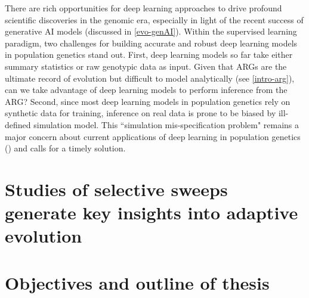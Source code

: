 There are rich opportunities for deep learning approaches to drive profound scientific discoveries in the genomic era, especially in light of the recent success of generative \ac{AI} models (discussed in \ref{evo-genAI}). Within the supervised learning paradigm, two challenges for building accurate and robust deep learning models in population genetics stand out. First, deep learning models so far take either summary statistics or raw genotypic data as input. Given that \acp{ARG} are the ultimate record of evolution but difficult to model analytically (see \ref{intro-arg}), can we take advantage of deep learning models to perform inference from the \ac{ARG}? Second, since most deep learning models in population genetics rely on synthetic data for training, inference on real data is prone to be biased by ill-defined simulation model. This ``simulation mis-specification problem" remains a major concern about current applications of deep learning in population genetics (\cite{korfmann_deep_2023}) and calls for a timely solution.

\section{Studies of selective sweeps generate key insights into adaptive evolution}



\section{Objectives and outline of thesis}


